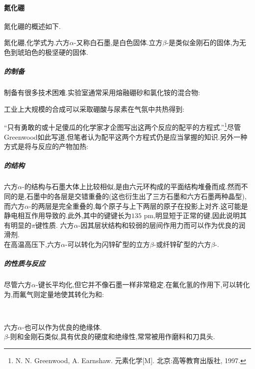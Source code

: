 \documentclass{ctexart}
\begin{document}
\paragraph{氮化硼}
氮化硼的概述如下.
\begin{substance}[\ce{BN}]
    氮化硼,化学式为.六方$\alpha$-又称白石墨,是白色固体.立方$\beta$-是类似金刚石的固体,为无色到琥珀色的极坚硬的固体.
\end{substance}
\subparagraph{的制备}
制备有很多技术困难.实验室通常采用熔融硼砂和氯化铵的混合物:
\begin{center}
\end{center}
工业上大规模的合成可以采取硼酸与尿素在气氛中共热得到:
\begin{center}
\end{center}
“只有勇敢的或十足傻瓜的化学家才企图写出这两个反应的配平的方程式.”\footnote{N. N. Greenwood, A. Earnshaw. 元素化学[M]. 北京:高等教育出版社, 1997.}尽管Greenwood如此写道,但笔者认为配平这两个方程式仍是应当掌握的知识.另外一种方式是将与反应的产物加热:
\begin{center}
\end{center}
\subparagraph{的结构}
六方$\alpha$-的结构与石墨大体上比较相似,是由六元环构成的平面结构堆叠而成.然而不同的是,石墨中的各层是交错重叠的(这也衍生出了三方石墨和六方石墨两种晶型),而六方$\alpha$-的两层是完全重叠的,每个原子与上下两层的原子在投影上对齐.这可能是静电相互作用导致的.此外,其中的键键长为$135\text{ pm}$,明显短于正常的键,因此说明其有明显的$\pi$键性质.
六方$\alpha$-因其层状结构和较弱的层间作用力而可以作为优良的润滑剂.\\
\indent 在高温高压下,六方$\alpha$-可以转化为闪锌矿型的立方$\beta$-或纤锌矿型的六方$\beta$-.
\subparagraph{的性质与反应}
尽管六方$\alpha$-键长平均化,但它并不像石墨一样非常稳定.在氟化氢的作用下,可以转化为,而氟气则定量地使其转化为和:
\begin{center}
    \\
\end{center}

\indent 六方$\alpha$-也可以作为优良的绝缘体.\\
\indent $\beta$-则和金刚石类似,具有优良的硬度和绝缘性,常常被用作磨料和刀具头.
\end{document}
